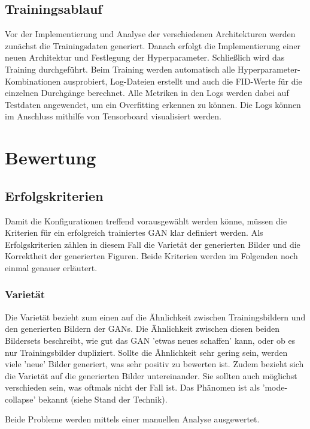 \subsection{Trainingsablauf}
Vor der Implementierung und Analyse der verschiedenen Architekturen werden zunächst die Trainingsdaten generiert.
Danach erfolgt die Implementierung einer neuen Architektur und Festlegung der Hyperparameter.
Schließlich wird das Training durchgeführt.
Beim Training werden automatisch alle Hyperparameter-Kombinationen ausprobiert, Log-Dateien erstellt und auch die FID-Werte für die einzelnen Durchgänge berechnet.
Alle Metriken in den Logs werden dabei auf Testdaten angewendet, um ein Overfitting erkennen zu können.
Die Logs können im Anschluss mithilfe von Tensorboard visualisiert werden.

\section{Bewertung}
\subsection{Erfolgskriterien}
Damit die Konfigurationen treffend vorausgewählt werden könne, müssen die Kriterien für ein erfolgreich trainiertes GAN klar definiert werden.
Als Erfolgskriterien zählen in diesem Fall die Varietät der generierten Bilder und die Korrektheit der generierten Figuren.
Beide Kriterien werden im Folgenden noch einmal genauer erläutert.

\subsubsection{Varietät}
Die Varietät bezieht zum einen auf die Ähnlichkeit zwischen Trainingsbildern und den generierten Bildern der GANs.
Die Ähnlichkeit zwischen diesen beiden Bildersets beschreibt, wie gut das GAN 'etwas neues schaffen' kann, oder ob es nur Trainingsbilder dupliziert.
Sollte die Ähnlichkeit sehr gering sein, werden viele 'neue' Bilder generiert, was sehr positiv zu bewerten ist.
Zudem bezieht sich die Varietät auf die generierten Bilder untereinander.
Sie sollten auch möglichst verschieden sein, was oftmals nicht der Fall ist.
Das Phänomen ist als 'mode-collapse' bekannt (siehe Stand der Technik). %

Beide Probleme werden mittels einer manuellen Analyse ausgewertet.

